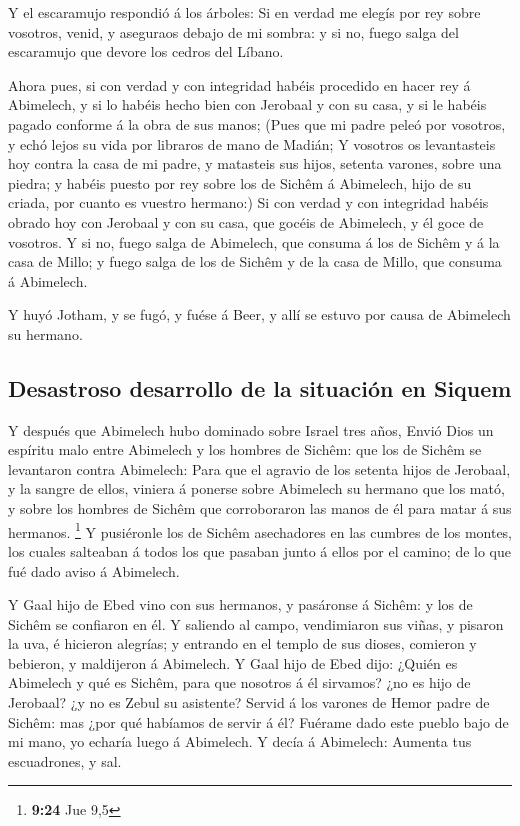  Y el escaramujo respondió á los árboles: Si en verdad me
elegís por rey sobre vosotros, venid, y aseguraos debajo de mi sombra: y
si no, fuego salga del escaramujo que devore los cedros del Líbano.

 Ahora pues, si con verdad y con integridad habéis
procedido en hacer rey á Abimelech, y si lo habéis hecho bien con
Jerobaal y con su casa, y si le habéis pagado conforme á la obra de sus
manos;  (Pues que mi padre peleó por vosotros, y echó
lejos su vida por libraros de mano de Madián;  Y vosotros
os levantasteis hoy contra la casa de mi padre, y matasteis sus hijos,
setenta varones, sobre una piedra; y habéis puesto por rey sobre los de
Sichêm á Abimelech, hijo de su criada, por cuanto es vuestro hermano:)
 Si con verdad y con integridad habéis obrado hoy con
Jerobaal y con su casa, que gocéis de Abimelech, y él goce de vosotros.
 Y si no, fuego salga de Abimelech, que consuma á los de
Sichêm y á la casa de Millo; y fuego salga de los de Sichêm y de la casa
de Millo, que consuma á Abimelech.

 Y huyó Jotham, y se fugó, y fuése á Beer, y allí se
estuvo por causa de Abimelech su hermano.

\hypertarget{desastroso-desarrollo-de-la-situaciuxf3n-en-siquem}{%
\subsection{Desastroso desarrollo de la situación en
Siquem}\label{desastroso-desarrollo-de-la-situaciuxf3n-en-siquem}}

 Y después que Abimelech hubo dominado sobre Israel tres
años,  Envió Dios un espíritu malo entre Abimelech y los
hombres de Sichêm: que los de Sichêm se levantaron contra Abimelech:
 Para que el agravio de los setenta hijos de Jerobaal, y
la sangre de ellos, viniera á ponerse sobre Abimelech su hermano que los
mató, y sobre los hombres de Sichêm que corroboraron las manos de él
para matar á sus hermanos. \footnote{\textbf{9:24} Jue 9,5}
 Y pusiéronle los de Sichêm asechadores en las cumbres de
los montes, los cuales salteaban á todos los que pasaban junto á ellos
por el camino; de lo que fué dado aviso á Abimelech.

 Y Gaal hijo de Ebed vino con sus hermanos, y pasáronse á
Sichêm: y los de Sichêm se confiaron en él.  Y saliendo
al campo, vendimiaron sus viñas, y pisaron la uva, é hicieron alegrías;
y entrando en el templo de sus dioses, comieron y bebieron, y maldijeron
á Abimelech.  Y Gaal hijo de Ebed dijo: ¿Quién es
Abimelech y qué es Sichêm, para que nosotros á él sirvamos? ¿no es hijo
de Jerobaal? ¿y no es Zebul su asistente? Servid á los varones de Hemor
padre de Sichêm: mas ¿por qué habíamos de servir á él? 
Fuérame dado este pueblo bajo de mi mano, yo echaría luego á Abimelech.
Y decía á Abimelech: Aumenta tus escuadrones, y sal.

